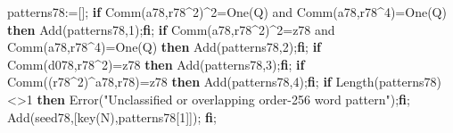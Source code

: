 \documentclass[
  10pt,
  letterpaper,
]{article}
\newenvironment{Shaded}{}{}
\newcommand{\BuiltInTok}[1]{\textcolor[rgb]{0.00,0.50,0.00}{#1}}
\newcommand{\ConstantTok}[1]{\textcolor[rgb]{0.53,0.00,0.00}{#1}}
\newcommand{\ControlFlowTok}[1]{\textcolor[rgb]{0.00,0.44,0.13}{\textbf{#1}}}
\newcommand{\FloatTok}[1]{\textcolor[rgb]{0.25,0.63,0.44}{#1}}
\newcommand{\NormalTok}[1]{#1}
\newcommand{\OperatorTok}[1]{\textcolor[rgb]{0.40,0.40,0.40}{#1}}
\newcommand{\StringTok}[1]{\textcolor[rgb]{0.25,0.44,0.63}{#1}}
\newcommand{\VariableTok}[1]{\textcolor[rgb]{0.10,0.09,0.49}{#1}}
\begin{document}
\begin{Shaded}
\begin{Highlighting}[]
    \VariableTok{patterns78}\OperatorTok{:=}\NormalTok{[]}\OperatorTok{;}
    \ControlFlowTok{if} \BuiltInTok{Comm}\NormalTok{(}\VariableTok{a78}\OperatorTok{,}\VariableTok{r78}\OperatorTok{\^{}}\FloatTok{2}\NormalTok{)}\OperatorTok{\^{}}\FloatTok{2}\OperatorTok{=}\BuiltInTok{One}\NormalTok{(}\VariableTok{Q}\NormalTok{) }\ConstantTok{and} \BuiltInTok{Comm}\NormalTok{(}\VariableTok{a78}\OperatorTok{,}\VariableTok{r78}\OperatorTok{\^{}}\FloatTok{4}\NormalTok{)}\OperatorTok{=}\BuiltInTok{One}\NormalTok{(}\VariableTok{Q}\NormalTok{) }\ControlFlowTok{then} \BuiltInTok{Add}\NormalTok{(}\VariableTok{patterns78}\OperatorTok{,}\FloatTok{1}\NormalTok{)}\OperatorTok{;}\ControlFlowTok{fi}\OperatorTok{;}
    \ControlFlowTok{if} \BuiltInTok{Comm}\NormalTok{(}\VariableTok{a78}\OperatorTok{,}\VariableTok{r78}\OperatorTok{\^{}}\FloatTok{2}\NormalTok{)}\OperatorTok{\^{}}\FloatTok{2}\OperatorTok{=}\VariableTok{z78} \ConstantTok{and} \BuiltInTok{Comm}\NormalTok{(}\VariableTok{a78}\OperatorTok{,}\VariableTok{r78}\OperatorTok{\^{}}\FloatTok{4}\NormalTok{)}\OperatorTok{=}\BuiltInTok{One}\NormalTok{(}\VariableTok{Q}\NormalTok{) }\ControlFlowTok{then} \BuiltInTok{Add}\NormalTok{(}\VariableTok{patterns78}\OperatorTok{,}\FloatTok{2}\NormalTok{)}\OperatorTok{;}\ControlFlowTok{fi}\OperatorTok{;}
    \ControlFlowTok{if} \BuiltInTok{Comm}\NormalTok{(}\VariableTok{d078}\OperatorTok{,}\VariableTok{r78}\OperatorTok{\^{}}\FloatTok{2}\NormalTok{)}\OperatorTok{=}\VariableTok{z78} \ControlFlowTok{then} \BuiltInTok{Add}\NormalTok{(}\VariableTok{patterns78}\OperatorTok{,}\FloatTok{3}\NormalTok{)}\OperatorTok{;}\ControlFlowTok{fi}\OperatorTok{;}
    \ControlFlowTok{if} \BuiltInTok{Comm}\NormalTok{((}\VariableTok{r78}\OperatorTok{\^{}}\FloatTok{2}\NormalTok{)}\OperatorTok{\^{}}\VariableTok{a78}\OperatorTok{,}\VariableTok{r78}\NormalTok{)}\OperatorTok{=}\VariableTok{z78} \ControlFlowTok{then} \BuiltInTok{Add}\NormalTok{(}\VariableTok{patterns78}\OperatorTok{,}\FloatTok{4}\NormalTok{)}\OperatorTok{;}\ControlFlowTok{fi}\OperatorTok{;}
    \ControlFlowTok{if} \BuiltInTok{Length}\NormalTok{(}\VariableTok{patterns78}\NormalTok{)}\OperatorTok{\textless{}\textgreater{}}\FloatTok{1} \ControlFlowTok{then} \BuiltInTok{Error}\NormalTok{(}\StringTok{"Unclassified or overlapping order{-}256 word pattern"}\NormalTok{)}\OperatorTok{;}\ControlFlowTok{fi}\OperatorTok{;}
    \BuiltInTok{Add}\NormalTok{(}\VariableTok{seed78}\OperatorTok{,}\NormalTok{[}\VariableTok{key}\NormalTok{(}\VariableTok{N}\NormalTok{)}\OperatorTok{,}\VariableTok{patterns78}\NormalTok{[}\FloatTok{1}\NormalTok{]])}\OperatorTok{;}
   \ControlFlowTok{fi}\OperatorTok{;}

\end{Highlighting}
\end{Shaded}
\end{document}
